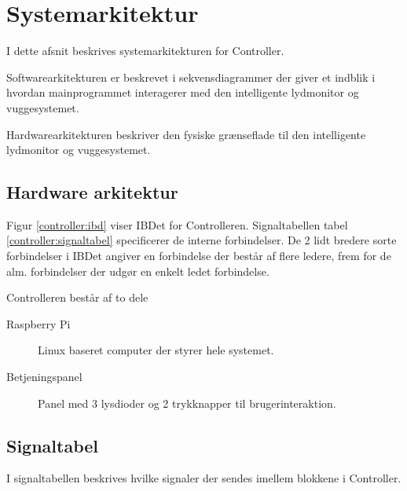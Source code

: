 \section{Systemarkitektur}

I dette afsnit beskrives systemarkitekturen for Controller.

Softwarearkitekturen er beskrevet i sekvensdiagrammer der giver et indblik i hvordan mainprogrammet interagerer med den intelligente lydmonitor og vuggesystemet.

Hardwarearkitekturen beskriver den fysiske grænseflade til den intelligente lydmonitor og vuggesystemet.



\subsection{Hardware arkitektur}


Figur \ref{controller:ibd} viser IBDet for Controlleren. Signaltabellen tabel \ref{controller:signaltabel} specificerer de interne forbindelser. De 2 lidt bredere sorte forbindelser i IBDet angiver en forbindelse der består af flere ledere, frem for de alm. forbindelser der udgør en enkelt ledet forbindelse. 

Controlleren består af to dele
\begin{description}
\item[Raspberry Pi] Linux baseret computer der styrer hele systemet. 
\item[Betjeningspanel] Panel med 3 lysdioder og 2 trykknapper til brugerinteraktion.
\end{description}

\newpage

\subsection{Signaltabel}

I signaltabellen beskrives hvilke signaler der sendes imellem blokkene i Controller.  

